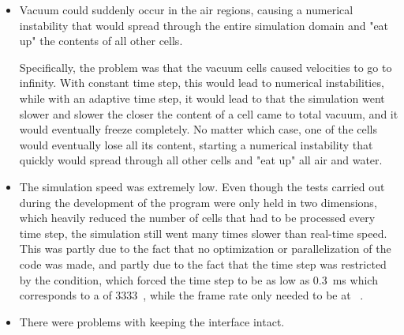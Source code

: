 \begin{itemize}
    \item Vacuum could suddenly occur in the air regions, causing a numerical instability that would spread through the entire simulation domain and "eat up" the contents of all other cells.
    
    Specifically, the problem was that the vacuum cells caused velocities to go to infinity. With constant time step, this would lead to numerical instabilities, while with an adaptive time step, it would lead to that the simulation went slower and slower the closer the content of a cell came to total vacuum, and it would eventually freeze completely. No matter which case, one of the cells would eventually lose all its content, starting a numerical instability that quickly would spread through all other cells and "eat up" all air and water.
    
    \item The simulation speed was extremely low. Even though the tests carried out during the development of the program were only held in two dimensions, which heavily reduced the number of cells that had to be processed every time step, the simulation still went many times slower than real-time speed. This was partly due to the fact that no optimization or parallelization of the code was made, and partly due to the fact that the time step was restricted by the \CFL condition, which forced the time step to be as low as 0.3~ms which corresponds to a  of 3333~\FPS, while the frame rate only needed to be at \flightsimulatorfps~\FPS.
    
    \item There were problems with keeping the interface intact. %
    
\end{itemize}


